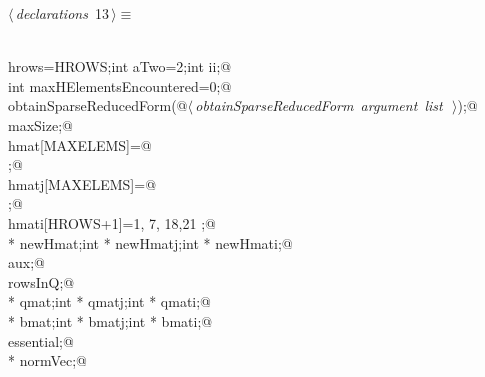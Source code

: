 \documentclass{article}
\begin{document}
\begin{flushleft}
\begin{minipage}{\linewidth}
\begin{list}{}{\setlength{\itemsep}{-\parsep}\setlength{\itemindent}{-\leftmargin}}
\item{}
\end{list}
\end{minipage}\vspace{4ex}
\end{flushleft}
\begin{flushleft} \small
\begin{minipage}{\linewidth}\label{scrap16}\raggedright\small
{} $\langle\,${\itshape declarations}\nobreak\ {\footnotesize {13}}$\,\rangle\equiv$
\vspace{-1ex}
\begin{list}{}{} \item
\mbox{}\verb@@\\
\mbox{}\verb@int hrows=HROWS;int aTwo=2;int ii;@\\
\mbox{}\verb@static int maxHElementsEncountered=0;@\\
\mbox{}\verb@void obtainSparseReducedForm(@\hbox{$\langle\,${\itshape obtainSparseReducedForm argument list}\nobreak\ {\footnotesize {}}$\,\rangle$}\verb@);@\\
\mbox{}\verb@int maxSize;@\\
\mbox{}\verb@double hmat[MAXELEMS]=@\\
\mbox{};@\\
\mbox{}\verb@int hmatj[MAXELEMS]=@\\
\mbox{};@\\
\mbox{}\verb@int hmati[HROWS+1]={1, 7, 18,21 };@\\
\mbox{}\verb@double * newHmat;int * newHmatj;int * newHmati;@\\
\mbox{}\verb@int aux;@\\
\mbox{}\verb@int rowsInQ;@\\
\mbox{}\verb@double * qmat;int * qmatj;int * qmati;@\\
\mbox{}\verb@double * bmat;int * bmatj;int * bmati;@\\
\mbox{}\verb@int essential;@\\
\mbox{}\verb@double * normVec;@\\

\end{list}
\end{minipage}
\end{flushleft}
\end{document}
